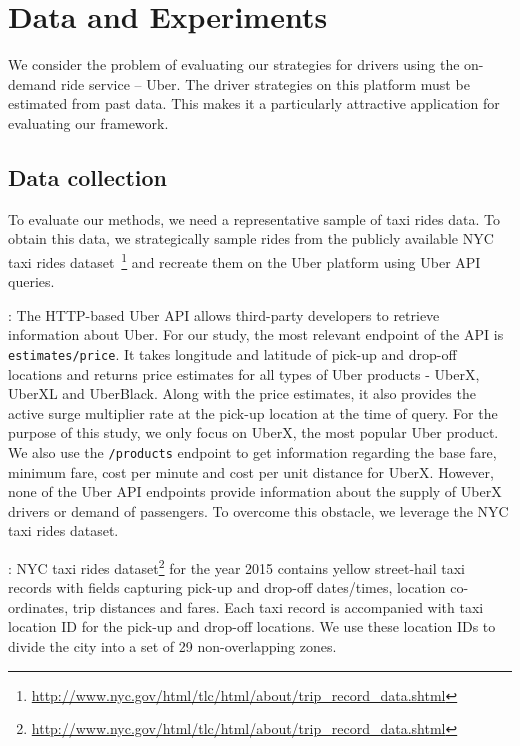 
\section{Data and Experiments}
\label{sec:experiments}

We consider the problem of evaluating our strategies for drivers using the on-demand ride service -- Uber. The driver strategies on this platform must be estimated from past data. This makes it a particularly attractive application for evaluating our framework.

\subsection{Data collection}
\label{sec:data}
To evaluate our methods, we need a representative sample of taxi rides data. To obtain this data, we strategically sample rides from the publicly available NYC taxi rides 
dataset~\footnote{\url{http://www.nyc.gov/html/tlc/html/about/trip_record_data.shtml}} and recreate them on the Uber platform using Uber API queries.

: 
The HTTP-based Uber API allows third-party developers to retrieve information about Uber. For our study, the most relevant endpoint of the API is \texttt{estimates/price}. It takes longitude and latitude of pick-up and drop-off locations and returns price estimates for all types of Uber products - UberX, UberXL and UberBlack. Along with the price estimates, it also provides the active surge multiplier rate at the pick-up location at the time of query. For the purpose of this study, we only focus on UberX, the most popular Uber product. We also use the \texttt{/products} endpoint to get information regarding the base fare, minimum fare, cost per minute and cost per unit distance for UberX. However, none of the Uber API endpoints provide information about the supply of UberX drivers or demand of passengers. To overcome this obstacle, we leverage the NYC taxi rides dataset.

:
NYC taxi rides dataset\footnote{\url{http://www.nyc.gov/html/tlc/html/about/trip_record_data.shtml}} for the year 2015 contains yellow street-hail taxi records with fields capturing pick-up and drop-off dates/times, location co-ordinates, trip distances and fares. Each taxi record is accompanied with taxi location ID for the pick-up and drop-off locations. We use these location IDs to divide the city into a set of 29 non-overlapping zones.

